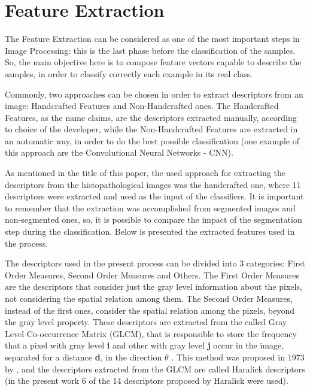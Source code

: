 \documentclass[conference]{IEEEtran}
\begin{document}
	\section{Feature Extraction}
		The Feature Extraction can be considered as one of the most important steps in Image Processing: this is the last phase before the classification of the samples. So, the main objective here is to compose feature vectors capable to describe the samples, in order to classify correctly each example in its real class.\par
		Commonly, two approaches can be chosen in order to extract descriptors from an image: Handcrafted Features and Non-Handcrafted ones. The Handcrafted Features, as the name claims, are the descriptors extracted manually, according to choice of the developer, while the Non-Handcrafted Features are extracted in an automatic way, in order to do the best possible classification (one example of this approach are the Convolutional Neural Networks - CNN). \par
		As mentioned in the title of this paper, the used approach for extracting the descriptors from the histopathological images was the handcrafted one, where 11 descriptors were extracted and used as the input of the classifiers. It is important to remember that the extraction was accomplished from segmented images and non-segmented ones, so, it is possible to compare the impact of the segmentation step during the classification. Below is presented the extracted features used in the process.\par
		The descriptors used in the present process can be divided into 3 categories: First Order Measures, Second Order Measures and Others. The First Order Measures are the descriptors that consider just the gray level information about the pixels, not considering the spatial relation among them. The Second Order Measures, instead of the first ones, consider the spatial relation among the pixels, beyond the gray level property. These descriptors are extracted from the called Gray Level Co-occurrence Matrix (GLCM), that is responsible to store the frequency that a pixel with gray level \textbf{i} and other with gray level \textbf{j} occur in the image, separated for a distance \textbf{d}, in the direction\textbf{ $\theta$} \cite{conci2008computacao}. This method was proposed in 1973 by \cite{haralick:smc1973}, and the descriptors extracted from the GLCM are called Haralick descriptors (in the present work 6 of the 14 descriptors proposed by Haralick were used).\par
\end{document}
